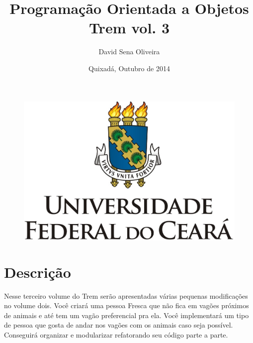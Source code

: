 \documentclass[12pt]{article}
\title{Programação Orientada a Objetos \\ Trem vol. 3}
\author{David Sena Oliveira}
\date{Quixadá, Outubro de 2014}
\begin{document}
\begin{figure}
\centering
\includegraphics[width=0.4\linewidth]{./imagens/ufc}
\label{fig:ufc}
\end{figure}

\maketitle

\section{Descrição}

Nesse terceiro volume do Trem serão apresentadas várias pequenas modificações no volume dois. Você criará uma pessoa Fresca que não fica em vagões próximos de animais e até tem um vagão preferencial pra ela.  Você implementará um tipo de pessoa que gosta de andar nos vagões com os animais caso seja possível. Conseguirá organizar e modularizar refatorando seu código parte a parte.

\begin{figure}
\caption*{}
\end{figure}
\end{document}
